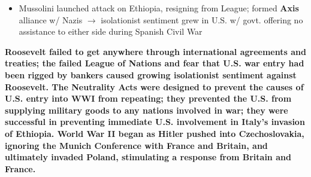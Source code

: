 \documentclass[a4paper]{article}
\begin{document}
{\begin{itemize}
\begin{itemize}
                \item Mussolini launched attack on Ethiopia, resigning from League; formed \textbf{Axis} alliance w/ Nazis $\to$ isolationist sentiment grew in U.S. w/ govt. offering no assistance to either side during Spanish Civil War
            \end{itemize}
        \end{itemize}
        \textbf{Roosevelt failed to get anywhere through international agreements and treaties; the failed League of Nations and fear that U.S. war entry had been rigged by bankers caused growing isolationist sentiment against Roosevelt. The Neutrality Acts were designed to prevent the causes of U.S. entry into WWI from repeating; they prevented the U.S. from supplying military goods to any nations involved in war; they were successful in preventing immediate U.S. involvement in Italy's invasion of Ethiopia. World War II began as Hitler pushed into Czechoslovakia, ignoring the Munich Conference with France and Britain, and ultimately invaded Poland, stimulating a response from Britain and France.}}
\end{document}
